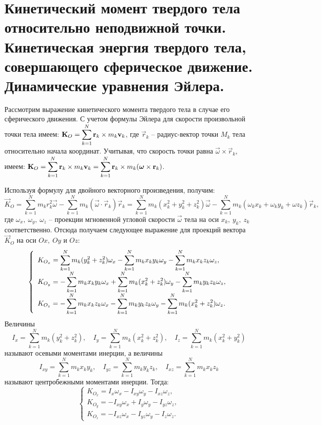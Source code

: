 \chapter{Кинетический момент твердого тела относительно неподвижной точки.
Кинетическая энергия твердого тела, совершающего сферическое движение.
Динамические уравнения Эйлера.}

Рассмотрим выражение кинетического момента твердого тела в случае его
сферического движения. С учетом формулы Эйлера для скорости произвольной
точки тела имеем: \( \displaystyle\boldsymbol{\mathrm{K}}_O = \sum_{k=1}^N\boldsymbol{\mathrm{r}}_k\times m_k\boldsymbol{\mathrm{v}}_k \),
где \( \vec{r}_k \) -- радиус-вектор точки \( M_k \) тела относительно начала
координат. Учитывая, что скорость точки равна \( \vec{\omega}\times\vec{r}_k \),
имеем: \( \displaystyle \boldsymbol{\mathrm{K}}_O = \sum_{k=1}^N\boldsymbol{\mathrm{r}}_k\times m_k\boldsymbol{\mathrm{v}}_k =
\sum_{k=1}^N \boldsymbol{\mathrm{r}}_k\times m_k(\boldsymbol{\mathrm{\omega}}\times\boldsymbol{\mathrm{r}}_k) \).

Используя формулу для двойного векторного произведения, получим:
\[
    \vec{K}_O = \sum_{k=1}^N m_k r_k^2\vec{\omega} - \sum_{k=1}^N m_k
    (\vec{\omega}\cdot\vec{r}_k)\vec{r}_k = \sum_{k=1}^N m_k(x_k^2 + y_k^2 +
    z_k^2)\vec{\omega} - \sum_{k=1}^N m_k (\omega_k x_k + \omega_k y_k + \omega
    z_k)\vec{r}_k,
\]
где \( \omega_x,\ \omega_y,\ \omega_z \) -- проекции мгновенной угловой скорости
\( \vec{\omega} \) тела на оси \( x_k,\ y_k,\ z_k \) соответственно. Отсюда
получаем следующее выражение для проекций вектора \( \vec{K}_O \) на оси
\( Ox,\ Oy \) и \( Oz \):
\[
    \left\{ \begin{array}{l}
        \displaystyle K_{O_x} = \sum_{k=1}^N m_k(y_k^2 + z_k^2)\omega_x - \sum_{k=1}^N m_k
        x_k y_k \omega_y - \sum_{k=1}^N m_k x_k z_k \omega_z, \\[.4em]
        \displaystyle K_{O_y} = -\sum_{k=1}^N m_k x_k y_k \omega_x + \sum_{k=1}^N m_k
        (x_k^2 + z_k^2)\omega_y  - \sum_{k=1}^N m_k y_k z_k \omega_z, \\[.4em]
        \displaystyle K_{O_z} = -\sum_{k=1}^N m_k x_k z_k \omega_x - \sum_{k=1}^N m_k y_k
        z_k \omega_y - \sum_{k=1}^N m_k (x_k^2 + z_k^2)\omega_z.
    \end{array} \right.
\]
Величины
\[
    I_x = \sum_{k=1}^N m_k(y_k^2 + z_k^2), \quad I_y = \sum_{k=1}^N m_k(x_k^2 +
    z_k^2), \quad I_z = \sum_{k=1}^N m_k(x_k^2 + y_k^2)
\]
называют осевыми моментами инерции, а величины
\[
    I_{xy} = \sum_{k=1}^N m_k x_k y_k, \quad I_{yz} = \sum_{k=1}^N m_k y_k z_k,
    \quad I_{xz} = \sum_{k=1}^N m_k x_k z_k
\]
называют центробежными моментами инерции. Тогда:
\[
    \left\{ \begin{array}{l}
        K_{O_x} = I_x\omega_x - I_{xy}\omega_y - I_{xz}\omega_z, \\
        K_{O_y} = -I_{xy}\omega_x + I_y\omega_y  - I_{yz}\omega_z, \\
        K_{O_z} = -I_{xz}\omega_x - I_{yz}\omega_y - I_z\omega_z.
    \end{array} \right.
\]

